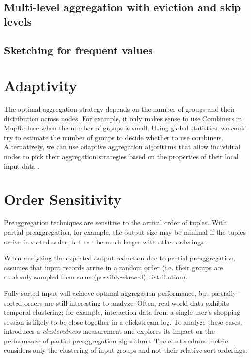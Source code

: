 \documentclass[12pt]{article}
\begin{document}
\subsection{Multi-level aggregation with eviction and skip levels}

\subsection{Sketching for frequent values}


\section{Adaptivity}

The optimal aggregation strategy depends on the number of groups and their
distribution across nodes.
For example, it only makes sense to use Combiners in MapReduce when the number of groups is small.
Using global statistics, we could try to estimate the number of groups to decide whether to use combiners.
Alternatively, we can use adaptive aggregation algorithms that allow individual nodes to pick their aggregation strategies based on the properties of their local input data \cite{adaptive-aggregation}.


\section{Order Sensitivity}
Preaggregation techniques are sensitive to the arrival order of tuples.  With partial preaggregation, for example, the output size may be minimal if the tuples arrive in sorted order, but can be much larger with other orderings \cite{partial-preaggregation}.

When analyzing the expected output reduction due to partial preaggregation, \cite{partial-preaggregation} assumes that input records arrive in a random order (i.e. their groups are randomly sampled from some (possibly-skewed) distribution).

Fully-sorted input will achieve optimal aggregation performance, but partially-sorted orders are still interesting to analyze.  Often, real-world data exhibits temporal clustering; for example, interaction data from a single user's shopping session is likely to be close together in a clickstream log.  To analyze these cases, \cite{estimating-cardinality} introduces a \emph{clusteredness} measurement and explores its impact on the performance of partial preaggregation algorithms.  The clusteredness metric considers only the clustering of input groups and not their relative sort orderings.
\end{document}
